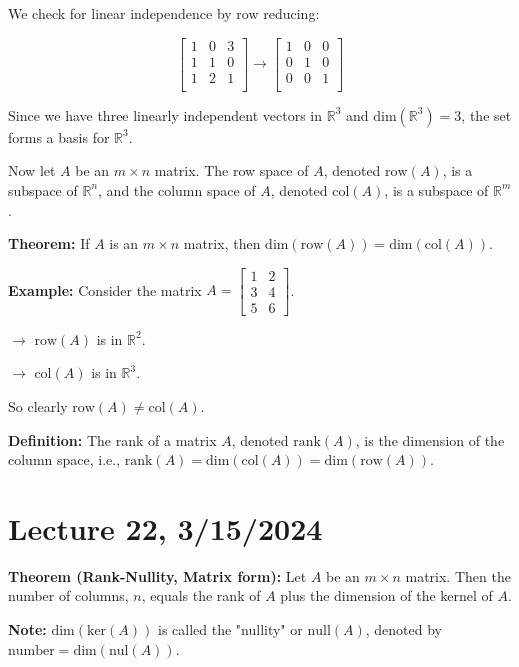 \documentclass{article}
\begin{document}
We check for linear independence by row reducing:

\[
\begin{bmatrix}
1 & 0 & 3 \\
1 & 1 & 0 \\
1 & 2 & 1 \\
\end{bmatrix}
\rightarrow
\begin{bmatrix}
1 & 0 & 0 \\
0 & 1 & 0 \\
0 & 0 & 1 \\
\end{bmatrix}
\]

Since we have three linearly independent vectors in $\mathbb{R}^3$ and $\text{dim}(\mathbb{R}^3) = 3$, the set forms a basis for $\mathbb{R}^3$.


Now let $A$ be an $m \times n$ matrix. The row space of $A$, denoted $\text{row}(A)$, is a subspace of $\mathbb{R}^n$, and the column space of $A$, denoted $\text{col}(A)$, is a subspace of $\mathbb{R}^m$.

\textbf{Theorem:} If $A$ is an $m \times n$ matrix, then $\text{dim}(\text{row}(A)) = \text{dim}(\text{col}(A))$.

\textbf{Example:} Consider the matrix $A = \begin{bmatrix} 1 & 2 \\ 3 & 4 \\ 5 & 6 \end{bmatrix}$.

$\rightarrow$ $\text{row}(A)$ is in $\mathbb{R}^2$.

$\rightarrow$ $\text{col}(A)$ is in $\mathbb{R}^3$.

So clearly $\text{row}(A) \neq \text{col}(A)$.

\textbf{Definition:} The rank of a matrix $A$, denoted $\text{rank}(A)$, is the dimension of the column space, i.e., $\text{rank}(A) = \text{dim}(\text{col}(A)) = \text{dim}(\text{row}(A))$.



\section{Lecture 22, 3/15/2024}

\textbf{Theorem (Rank-Nullity, Matrix form):}
Let $A$ be an $m \times n$ matrix. Then the number of columns, $n$, equals the rank of $A$ plus the dimension of the kernel of $A$.

\textbf{Note:} $\text{dim}(\text{ker}(A))$ is called the "nullity" or $\text{null}(A)$, denoted by $\text{number} = \text{dim}(\text{nul}(A))$.
\end{document}
